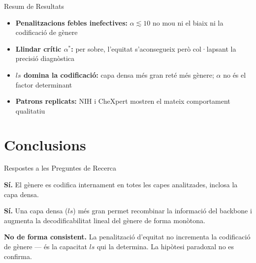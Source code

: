\documentclass[aspectratio=169,12pt]{beamer}
\begin{document}
\begin{frame}{Resum de Resultats}
  \begin{itemize}
    \setlength\itemsep{0.9em}
    \item \textbf{Penalitzacions febles inefectives:} $\alpha \lesssim 10$ no mou ni el \alert{biaix} ni la \alert{codificació de gènere}
    \item \textbf{Llindar crític $\alpha^*$:} per sobre, l'\alert{equitat} s'aconsegueix però \alert{col·lapsant la precisió} diagnòstica
    \item \textbf{{\boldmath$ls$} domina la codificació:} capa densa més gran reté més gènere; \alert{$\alpha$ no} és el factor determinant
    \item \textbf{Patrons replicats:} NIH i CheXpert mostren el \alert{mateix comportament} qualitatiu
  \end{itemize}
\end{frame}

\section{Conclusions}

\begin{frame}{Respostes a les Preguntes de Recerca}
  \begin{description}[\textbf{RQ3}]
    \setlength\itemsep{0.8em}
    \item[\textbf{RQ1}] \textcolor{green!50!black}{\textbf{Sí.}} El gènere es codifica internament en totes les capes analitzades, inclosa la capa densa.

    \item[\textbf{RQ2}] \textcolor{green!50!black}{\textbf{Sí.}} Una capa densa ($ls$) més gran permet recombinar la informació del backbone i augmenta la decodificabilitat lineal del gènere de forma monòtona.

    \item[\textbf{RQ3}] \textcolor{orange!80!black}{\textbf{No de forma consistent.}} La penalització d'equitat no incrementa la codificació de gènere — és la capacitat $ls$ qui la determina. La hipòtesi paradoxal no es confirma.
  \end{description}
\end{frame}
\end{document}
